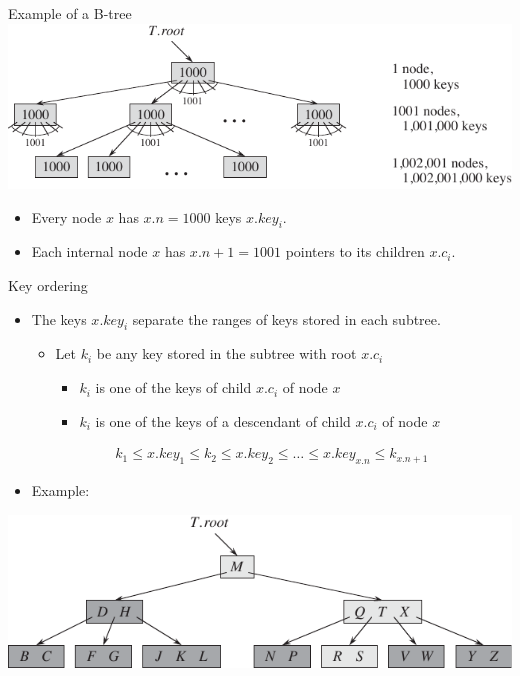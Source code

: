\documentclass[11pt,t]{beamer}
\begin{document}
	\begin{frame}{Example of a B-tree}
		\centering
		\includegraphics{images/nodes_keys}
		\vspace{0.5cm}
		\begin{itemize}[<+->]
			\item Every node \(x\) has \(x.n=1000\) keys \(x.key_i\).
			\item Each internal node \(x\) has \(x.n+1=1001\) pointers to its children \(x.c_i\).
		\end{itemize}
	\end{frame}

	\begin{frame}{Key ordering}
		\begin{itemize}[<+->]
			\item The keys \(x.key_i\) separate the ranges of keys stored in each subtree. \begin{itemize}[<+->]
				\item Let \(k_i\) be any key stored in the subtree with root \(x.c_i\)
				\begin{itemize}
					\item \(k_i\) is one of the keys of child \(x.c_i\) of node \(x\)
					\item \(k_i\) is one of the keys of a descendant of child \(x.c_i\) of node \(x\)
				\end{itemize}
			\end{itemize}
			\vspace{-0.3cm}
			\onslide<+-> \begin{align*}
				k_1 \leq x.key_1 \leq k_2 \leq x.key_2 \leq \ldots \leq x.key_{x.n} \leq k_{x.n+1}
			\end{align*} \vspace{-0.8cm}
			\item Example:
		\end{itemize}
		 \vspace{-0.3cm} \centering \includegraphics[width=.7\textwidth]{images/letters}
	\end{frame}
\end{document}
